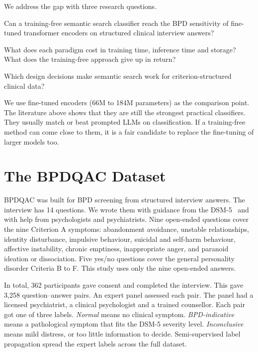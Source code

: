 \documentclass[11pt]{article}
\newcommand{\bpdqac}{BPDQAC}
\newcommand{\dsmv}{DSM-5}
\begin{document}
We address the gap with three research questions.
\begin{description}[leftmargin=1.2cm,style=nextline,itemsep=2pt]
  \item[RQ1] Can a training-free semantic search classifier reach the BPD sensitivity of fine-tuned
             transformer encoders on structured clinical interview answers?
  \item[RQ2] What does each paradigm cost in training time, inference time and storage? What does
             the training-free approach give up in return?
  \item[RQ3] Which design decisions make semantic search work for criterion-structured clinical
             data?
\end{description}

We use fine-tuned encoders (66M to 184M parameters) as the comparison point. The literature above
shows that they are still the strongest practical classifiers. They usually match or beat prompted
LLMs on classification. If a training-free method can come close to them, it is a fair candidate
to replace the fine-tuning of larger models too.

\section{The BPDQAC Dataset}\label{sec:dataset}

\bpdqac{} was built for BPD screening from structured interview answers. The interview has 14
questions. We wrote them with guidance from the \dsmv{}~\cite{dsm} and with help from psychologists
and psychiatrists. Nine open-ended questions cover the nine Criterion A symptoms: abandonment
avoidance, unstable relationships, identity disturbance, impulsive behaviour, suicidal and
self-harm behaviour, affective instability, chronic emptiness, inappropriate anger, and paranoid
ideation or dissociation. Five yes/no questions cover the general personality disorder Criteria B
to F. This study uses only the nine open-ended answers.

In total, 362 participants gave consent and completed the interview. This gave 3,258
question--answer pairs. An expert panel assessed each pair. The panel had a licensed psychiatrist, a
clinical psychologist and a trained counsellor. Each pair got one of three labels. \emph{Normal}
means no clinical symptom. \emph{BPD-indicative} means a pathological symptom that fits the \dsmv{}
severity level. \emph{Inconclusive} means mild distress, or too little information to decide.
Semi-supervised label propagation spread the expert labels across the full dataset.
\end{document}
